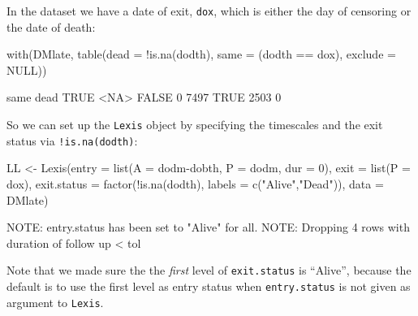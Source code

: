 \begin{enumerate}
  In the dataset we have a date of exit, \texttt{dox}, which is either
  the day of censoring or the date of death:
\begin{Schunk}
\begin{Sinput}
 with(DMlate, table(dead = !is.na(dodth),
                    same = (dodth == dox), exclude = NULL))
\end{Sinput}
\begin{Soutput}
       same
dead    TRUE <NA>
  FALSE    0 7497
  TRUE  2503    0
\end{Soutput}
\end{Schunk}
  So we can set up the \texttt{Lexis} object by specifying the
  timescales and the exit status via \texttt{!is.na(dodth)}:
\begin{Schunk}
\begin{Sinput}
 LL <- Lexis(entry = list(A = dodm-dobth,
                          P = dodm,
                        dur = 0),
              exit = list(P = dox),
       exit.status = factor(!is.na(dodth),
                            labels = c("Alive","Dead")),
              data = DMlate)
\end{Sinput}
\begin{Soutput}
NOTE: entry.status has been set to "Alive" for all.
NOTE: Dropping  4  rows with duration of follow up < tol
\end{Soutput}
\end{Schunk}
Note that we made sure the the \emph{first} level of
\texttt{exit.status} is ``Alive'', because the default is to use the
first level as entry status when \texttt{entry.status} is not given as
argument to \texttt{Lexis}.


\end{enumerate}
